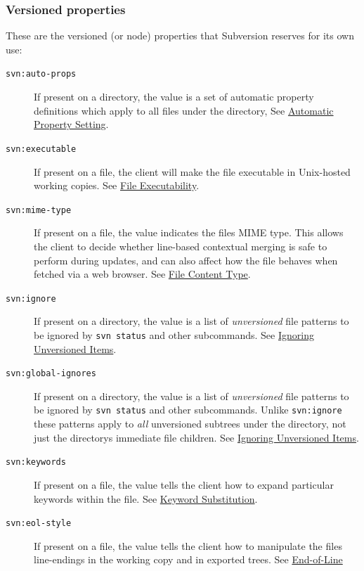 \subsubsection{Versioned
properties}\label{svn.advanced.props.ref.versioned}

These are the versioned (or node) properties that Subversion reserves
for its own use:

\begin{description}
\item[\texttt{svn:auto-props}]
If present on a directory, the value is a set of automatic property
definitions which apply to all files under the directory, See
\hyperref[svn.advanced.props.auto]{Automatic Property Setting}.
\item[\texttt{svn:executable}]
If present on a file, the client will make the file executable in
Unix-hosted working copies. See
\hyperref[svn.advanced.props.special.executable]{File Executability}.
\item[\texttt{svn:mime-type}]
If present on a file, the value indicates the file\textquotesingle s
MIME type. This allows the client to decide whether line-based
contextual merging is safe to perform during updates, and can also
affect how the file behaves when fetched via a web browser. See
\hyperref[svn.advanced.props.special.mime-type]{File Content Type}.
\item[\texttt{svn:ignore}]
If present on a directory, the value is a list of \emph{unversioned}
file patterns to be ignored by \texttt{svn\ status} and other
subcommands. See \hyperref[svn.advanced.props.special.ignore]{Ignoring
Unversioned Items}.
\item[\texttt{svn:global-ignores}]
If present on a directory, the value is a list of \emph{unversioned}
file patterns to be ignored by \texttt{svn\ status} and other
subcommands. Unlike \texttt{svn:ignore} these patterns apply to
\emph{all} unversioned subtrees under the directory, not just the
directory\textquotesingle s immediate file children. See
\hyperref[svn.advanced.props.special.ignore]{Ignoring Unversioned
Items}.
\item[\texttt{svn:keywords}]
If present on a file, the value tells the client how to expand
particular keywords within the file. See
\hyperref[svn.advanced.props.special.keywords]{Keyword Substitution}.
\item[\texttt{svn:eol-style}]
If present on a file, the value tells the client how to manipulate the
file\textquotesingle s line-endings in the working copy and in exported
trees. See \hyperref[svn.advanced.props.special.eol-style]{End-of-Line
}
\end{description}

